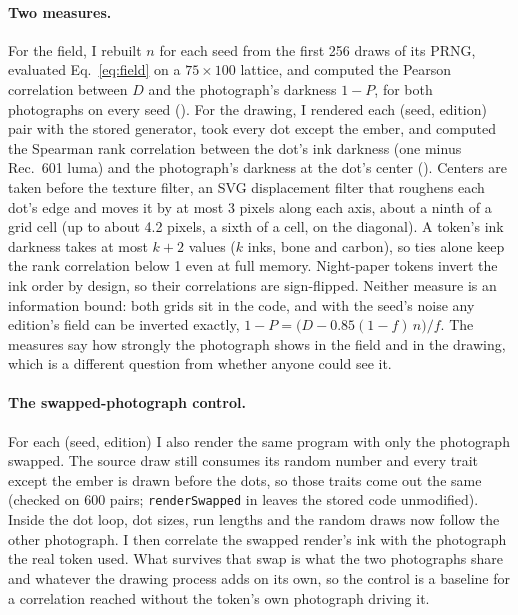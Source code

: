 \documentclass[11pt]{article}
\begin{document}
\paragraph{Two measures.} For the field, I rebuilt $n$ for each seed from the first 256 draws of its PRNG, evaluated Eq.~\eqref{eq:field} on a $75\times100$ lattice, and computed the Pearson correlation between $D$ and the photograph's darkness $1-P$, for both photographs on every seed (). For the drawing, I rendered each (seed, edition) pair with the stored generator, took every dot except the ember, and computed the Spearman rank correlation \citep{spearman1904} between the dot's ink darkness (one minus Rec.~601 luma) and the photograph's darkness at the dot's center (). Centers are taken before the texture filter, an SVG displacement filter that roughens each dot's edge and moves it by at most 3 pixels along each axis, about a ninth of a grid cell (up to about 4.2 pixels, a sixth of a cell, on the diagonal). A token's ink darkness takes at most $k+2$ values ($k$ inks, bone and carbon), so ties alone keep the rank correlation below 1 even at full memory. Night-paper tokens invert the ink order by design, so their correlations are sign-flipped. Neither measure is an information bound: both grids sit in the code, and with the seed's noise any edition's field can be inverted exactly, $1-P = \bigl(D - 0.85(1-f)\,n\bigr)/f$. The measures say how strongly the photograph shows in the field and in the drawing, which is a different question from whether anyone could see it.

\paragraph{The swapped-photograph control.} For each (seed, edition) I also render the same program with only the photograph swapped. The source draw still consumes its random number and every trait except the ember is drawn before the dots, so those traits come out the same (checked on 600 pairs; \texttt{renderSwapped} in  leaves the stored code unmodified). Inside the dot loop, dot sizes, run lengths and the random draws now follow the other photograph. I then correlate the swapped render's ink with the photograph the real token used. What survives that swap is what the two photographs share and whatever the drawing process adds on its own, so the control is a baseline for a correlation reached without the token's own photograph driving it.
\end{document}
